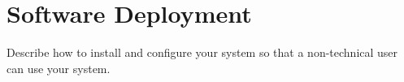 \section{Software Deployment}\label{sec:sd}
Describe how to install and configure your system so that a non-technical user can use your system. 

\clearpage